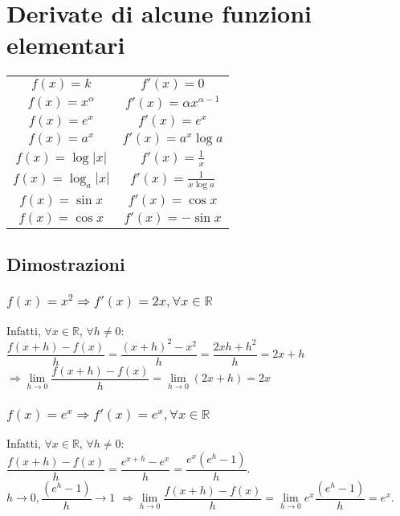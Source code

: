 \section{Derivate di alcune funzioni elementari}
\begin{tabular}{|c|c|}
\hline
$f(x)=k$ & $f'(x)=0$\\
$f(x)=x^\alpha$ & $f'(x)=\alpha x^{\alpha-1}$\\
$f(x)=e^x$ & $f'(x)=e^x$\\
$f(x)=a^x$ & $f'(x)=a^x\log a$\\
$f(x)=\log |x|$ & $f'(x)=\frac{1}{x}$\\
$f(x)=\log_a |x|$ & $f'(x)=\frac{1}{x\log a}$\\
$f(x)=\sin x$ & $f'(x)=\cos x$\\
$f(x)=\cos x$ & $f'(x)=-\sin x$\\
\hline
\end{tabular}
\subsection{Dimostrazioni}
\subsubsection{$f(x)=x^2\Rightarrow f'(x)=2x,\forall x\in\mathbb{R}$}
Infatti, $\forall x\in\mathbb{R}$, $\forall h\neq 0$:\\
$\dfrac{f(x+h)-f(x)}{h}=\dfrac{(x+h)^2-x^2}{h}=\dfrac{2xh+h^2}{h}=2x+h$\\
$\Rightarrow \lim\limits_{h\rightarrow 0}\dfrac{f(x+h)-f(x)}{h}=\lim\limits_{h\rightarrow 0}(2x+h)=2x$
\subsubsection{$f(x)=e^x\Rightarrow f'(x)=e^x,\forall x\in\mathbb{R}$}
Infatti, $\forall x\in\mathbb{R}$, $\forall h\neq 0$:\\
$\dfrac{f(x+h)-f(x)}{h}=\dfrac{e^{x+h}-e^x}{h}=\dfrac{e^x(e^h-1)}{h}$.\\
$h\rightarrow 0, \dfrac{(e^h-1)}{h}\rightarrow 1$
$\Rightarrow \lim\limits_{h\rightarrow 0}\dfrac{f(x+h)-f(x)}{h}=\lim\limits_{h\rightarrow 0}e^x\dfrac{(e^h-1)}{h}=e^x$.
